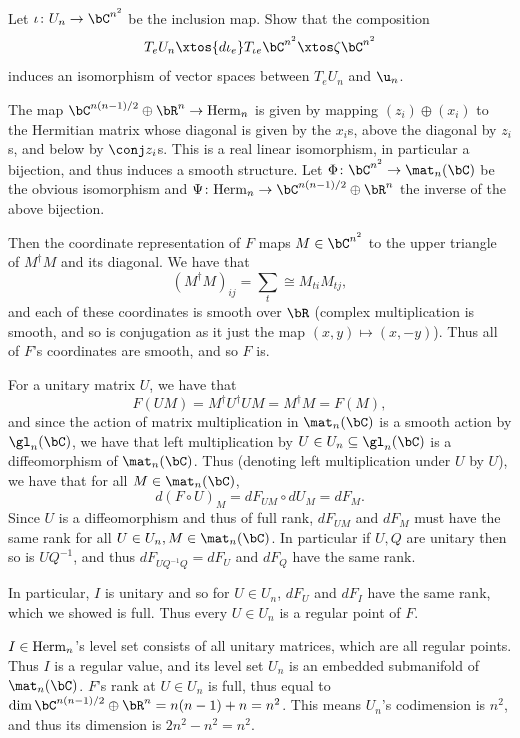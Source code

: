         \item Let $\iota\colon U_n\to\bC^{n^2}$ be the inclusion map.
        Show that the composition
        $$ T_eU_n \xtos{d\iota_e} T_{\iota e}\bC^{n^2} \xtos\zeta \bC^{n^2} $$
        induces an isomorphism of vector spaces between $T_eU_n$ and $\u_n$.
    \eenum

\eprob

\benum
    \item The map $\bC^{n(n-1)/2}\oplus\bR^n\to\herm_n$ is given by mapping $(z_i)\oplus(x_i)$ to the Hermitian matrix whose diagonal is given by the
    $x_i$s, above the diagonal by $z_i$s, and below by $\conj z_i$s.
    This is a real linear isomorphism, in particular a bijection, and thus induces a smooth structure.
    Let $\Phi\colon\bC^{n^2}\to\mat_n(\bC)$ be the obvious isomorphism and $\Psi\colon\herm_n\to\bC^{n(n-1)/2}\oplus\bR^n$ the inverse of the above bijection.

    Then the coordinate representation of $F$ maps $M\in\bC^{n^2}$ to the upper triangle of $M^\dagger M$ and its diagonal.
    We have that
    $$ (M^\dagger M)_{ij} = \sum_t\cong M_{ti}M_{tj} , $$
    and each of these coordinates is smooth over $\bR$ (complex multiplication is smooth, and so is conjugation as it just the map $(x,y)\mapsto(x,-y)$).
    Thus all of $F$'s coordinates are smooth, and so $F$ is.

    \item For a unitary matrix $U$, we have that
    $$ F(UM) = M^\dagger U^\dagger UM = M^\dagger M = F(M) , $$
    and since the action of matrix multiplication in $\mat_n(\bC)$ is a smooth action by $\gl_n(\bC)$, we have that left multiplication by $U\in U_n\subseteq\gl_n(\bC)$
    is a diffeomorphism of $\mat_n(\bC)$.
    Thus (denoting left multiplication under $U$ by $U$), we have that for all $M\in\mat_n(\bC)$,
    $$ d(F\circ U)_M = dF_{UM}\circ dU_M = dF_M . $$
    Since $U$ is a diffeomorphism and thus of full rank, $dF_{UM}$ and $dF_M$ must have the same rank for all $U\in U_n,M\in\mat_n(\bC)$.
    In particular if $U,Q$ are unitary then so is $UQ^{-1}$, and thus $dF_{UQ^{-1}Q}=dF_U$ and $dF_Q$ have the same rank.

    In particular, $I$ is unitary and so for $U\in U_n$, $dF_U$ and $dF_I$ have the same rank, which we showed is full.
    Thus every $U\in U_n$ is a regular point of $F$.

    \item $I\in{\rm Herm}_n$'s level set consists of all unitary matrices, which are all regular points.
    Thus $I$ is a regular value, and its level set $U_n$ is an embedded submanifold of $\mat_n(\bC)$.
    $F$'s rank at $U\in U_n$ is full, thus equal to $\dim\bC^{n(n-1)/2}\oplus\bR^n=n(n-1)+n=n^2$.
    This means $U_n$'s codimension is $n^2$, and thus its dimension is $2n^2-n^2=n^2$.

